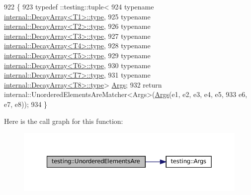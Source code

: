 \begin{DoxyCode}
922                                                             \{
923   typedef ::testing::tuple<
924       \textcolor{keyword}{typename} \hyperlink{namespacegenerate__debs_a50bc9a7ecac9584553e089a448bcde58}{internal::DecayArray<T1>::type},
925       \textcolor{keyword}{typename} \hyperlink{namespacegenerate__debs_a50bc9a7ecac9584553e089a448bcde58}{internal::DecayArray<T2>::type},
926       \textcolor{keyword}{typename} \hyperlink{namespacegenerate__debs_a50bc9a7ecac9584553e089a448bcde58}{internal::DecayArray<T3>::type},
927       \textcolor{keyword}{typename} \hyperlink{namespacegenerate__debs_a50bc9a7ecac9584553e089a448bcde58}{internal::DecayArray<T4>::type},
928       \textcolor{keyword}{typename} \hyperlink{namespacegenerate__debs_a50bc9a7ecac9584553e089a448bcde58}{internal::DecayArray<T5>::type},
929       \textcolor{keyword}{typename} \hyperlink{namespacegenerate__debs_a50bc9a7ecac9584553e089a448bcde58}{internal::DecayArray<T6>::type},
930       \textcolor{keyword}{typename} \hyperlink{namespacegenerate__debs_a50bc9a7ecac9584553e089a448bcde58}{internal::DecayArray<T7>::type},
931       \textcolor{keyword}{typename} \hyperlink{namespacegenerate__debs_a50bc9a7ecac9584553e089a448bcde58}{internal::DecayArray<T8>::type}> 
      \hyperlink{namespacetesting_a09ac462e8d6ed468cbfaa9c767aee0aa}{Args};
932   \textcolor{keywordflow}{return} internal::UnorderedElementsAreMatcher<Args>(\hyperlink{namespacetesting_a09ac462e8d6ed468cbfaa9c767aee0aa}{Args}(e1, e2, e3, e4, e5,
933       e6, e7, e8));
934 \}
\end{DoxyCode}
Here is the call graph for this function\+:
\nopagebreak
\begin{figure}[H]
\begin{center}
\leavevmode
\includegraphics[width=350pt]{namespacetesting_a0f30358234947d21c7f39f15a8395d04_cgraph}
\end{center}
\end{figure}
\mbox{\label{namespacetesting_a2e03e363e193ef512bf9fa964c484375}} 
